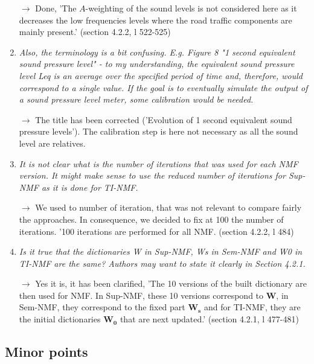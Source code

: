 \documentclass[10pt]{article}
\begin{document}
\begin{enumerate}
$\rightarrow$ Done, 'The $A$-weighting of the sound levels is not considered here as it decreases the low frequencies levels where the road traffic components are mainly present.' (section 4.2.2, l 522-525)

\item \emph{Also, the terminology is a bit confusing. E.g. Figure 8 "1 second equivalent sound pressure level" - to my understanding, the equivalent sound pressure level Leq is an average over the specified period of time and, therefore, would correspond to a single value. If the goal is to eventually simulate the output of a sound pressure level meter, some calibration would be needed.}

$\rightarrow$ The title has been corrected ('Evolution of 1 second equivalent sound pressure levels'). The calibration step is here not necessary as all the sound level are relatives.

\item \emph{It is not clear what is the number of iterations that was used for each NMF version. It might make sense to use the reduced number of iterations for Sup-NMF as it is done for TI-NMF.}

$\rightarrow$ We used to number of iteration, that was not relevant to compare fairly the approaches. In consequence, we decided to fix at 100 the number of iterations. '100 iterations are performed for all NMF. (section 4.2.2, l 484)

\item \emph{Is it true that the dictionaries W in Sup-NMF, Ws in Sem-NMF and W0 in TI-NMF are the same? Authors may want to state it clearly in Section 4.2.1.}

$\rightarrow$ Yes it is, it has been clarified, 'The 10 versions of the built dictionary are then used for NMF. In Sup-NMF, these 10 versions correspond to $\mathbf{W}$, in Sem-NMF, they correspond to the fixed part $\mathbf{W_s}$ and for TI-NMF, they are the initial dictionaries $\mathbf{W_0}$ that are next updated.' (section 4.2.1, l 477-481)

\end{enumerate}
\subsection{Minor points}
\end{document}
